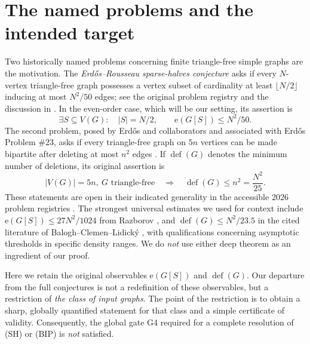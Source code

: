 \documentclass[11pt,a4paper]{article}
\newcommand{\edges}{\mathrm e}
\newcommand{\defect}{\operatorname{def}}
\newcommand{\card}[1]{\lvert#1\rvert}
\begin{document}
\section{The named problems and the intended target}
Two historically named problems concerning finite triangle-free simple graphs are the motivation. The \emph{Erd\H{o}s--Rousseau sparse-halves conjecture} asks if every $N$-vertex triangle-free graph possesses a vertex subset of cardinality at least $\lfloor N/2\rfloor$ inducing at most $N^2/50$ edges; see the original problem registry \cite{EP128} and the discussion in \cite{Raz2022}. In the even-order case, which will be our setting, its assertion is
\begin{equation}\tag{SH}\label{eq:SH}
\exists S\subseteq V(G):\quad \card S=N/2,\qquad \edges(G[S])\le N^2/50.
\end{equation}
The second problem, posed by Erd\H{o}s and collaborators and associated with Erd\H{o}s Problem \#23, asks if every triangle-free graph on $5n$ vertices can be made bipartite after deleting at most $n^2$ edges \cite{EFPS1988,EP23}. If $\defect(G)$ denotes the minimum number of deletions, its original assertion is
\begin{equation}\tag{BIP}\label{eq:BIP}
\card{V(G)}=5n,\ G\text{ triangle-free}\quad\Longrightarrow\quad
\defect(G)\le n^2=\frac{N^2}{25}.
\end{equation}
These statements are open in their indicated generality in the accessible 2026 problem registries \cite{EP128,EP23}. The strongest universal estimates we used for context include $\edges(G[S])\le27N^2/1024$ from Razborov \cite{Raz2022}, and $\defect(G)\le N^2/23.5$ in the cited literature of Balogh--Clemen--Lidick\'y \cite{BCL2021}, with qualifications concerning asymptotic thresholds in specific density ranges. We do \emph{not} use either deep theorem as an ingredient of our proof.

Here we retain the original observables $\edges(G[S])$ and $\defect(G)$. Our departure from the full conjectures is not a redefinition of these observables, but a restriction of \emph{the class of input graphs}. The point of the restriction is to obtain a sharp, globally quantified statement for that class and a simple certificate of validity. Consequently, the global gate G4 required for a complete resolution of (SH) or (BIP) is \emph{not} satisfied.
\end{document}
